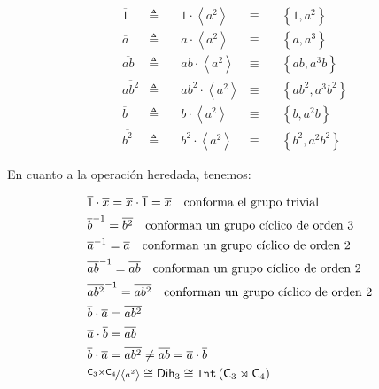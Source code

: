 \documentclass[12pt,a4paper,fleqn,spanish,final,openright]{extbook}
\theoremstyle{definition}
\theoremstyle{remark}
\begin{document}
\begin{align*}
&\overline{1}
&\triangleq&\quad
{1}   \cdot {\left\langle{a^2}\right\rangle}
&   \equiv   &\quad
{\left\lbrace{1,a^2}\right\rbrace}\\
&\overline{a}
&\triangleq&\quad
{a}   \cdot {\left\langle{a^2}\right\rangle}
&   \equiv   &\quad
{\left\lbrace{a,a^3}\right\rbrace}\\
&\overline{ab}
&\triangleq&\quad
{ab}   \cdot {\left\langle{a^2}\right\rangle}
&   \equiv   &\quad
{\left\lbrace{ab,a^3b}\right\rbrace}\\
&\overline{ab^2}
&\triangleq&\quad
{ab^2}   \cdot {\left\langle{a^2}\right\rangle}
&   \equiv   &\quad
{\left\lbrace{ab^2,a^3b^2}\right\rbrace}
\\
&\overline{b}
&\triangleq&\quad
{b}   \cdot {\left\langle{a^2}\right\rangle}
&   \equiv   &\quad
{\left\lbrace{b,a^2b}\right\rbrace}\\
&\overline{b^2}
&\triangleq&\quad
{b^2}   \cdot {\left\langle{a^2}\right\rangle}
&   \equiv   &\quad
{\left\lbrace{b^2,a^2b^2}\right\rbrace}
\end{align*}

En cuanto a la operación heredada, tenemos:

\begin{align*}
&\overline{1}   \cdot \overline{x}=\overline{x}   \cdot \overline{1}=\overline{x}\quad \mbox{conforma el grupo trivial}\\
&{\overline{b}}^{-1}={\overline{b^2}}\quad \mbox{conforman un grupo cíclico de orden 3}\\
&{\overline{a}}^{-1}={\overline{a}}\quad \mbox{conforman un grupo cíclico de orden 2}\\
&{\overline{ab}}^{-1}={\overline{ab}}\quad \mbox{conforman un grupo cíclico de orden 2}\\
&{\overline{ab^2}}^{-1}={\overline{ab^2}}\quad \mbox{conforman un grupo cíclico de orden 2}\\
&{\overline{b}}   \cdot {\overline{a}}=\overline{ab^2}\\
&{\overline{a}}   \cdot {\overline{b}}=\overline{ab}\\
&{\overline{b}}   \cdot {\overline{a}}=\overline{ab^2}   \neq   \overline{ab}={\overline{a}}   \cdot {\overline{b}}\\
&\nicefrac{{{\mathsf{C}}_{3}}\rtimes{{\mathsf{C}}_{4}}}{\left\langle a^2 \right\rangle}    \cong   {{\mathsf{Dih}}_{3}}   \cong    {\mathtt{Int}\left({{{\mathsf{C}}_{3}}\rtimes{{\mathsf{C}}_{4}}}\right)}
\end{align*}
\end{document}
